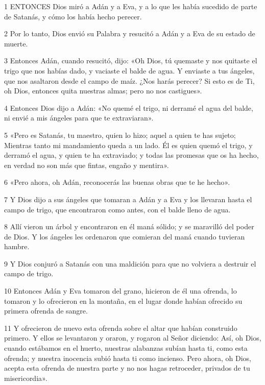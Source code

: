 \par 1 ENTONCES Dios miró a Adán y a Eva, y a lo que les había sucedido de parte de Satanás, y cómo los había hecho perecer.

\par 2 Por lo tanto, Dios envió su Palabra y resucitó a Adán y a Eva de su estado de muerte.

\par 3 Entonces Adán, cuando resucitó, dijo: «Oh Dios, tú quemaste y nos quitaste el trigo que nos habías dado, y vaciaste el balde de agua. Y enviaste a tus ángeles, que nos asaltaron desde el campo de maíz. ¿Nos harás perecer? Si esto es de Ti, oh Dios, entonces quita nuestras almas; pero no nos castigues».

\par 4 Entonces Dios dijo a Adán: «No quemé el trigo, ni derramé el agua del balde, ni envié a mis ángeles para que te extraviaran».

\par 5 «Pero es Satanás, tu maestro, quien lo hizo; aquel a quien te has sujeto; Mientras tanto mi mandamiento queda a un lado. Él es quien quemó el trigo, y derramó el agua, y quien te ha extraviado; y todas las promesas que os ha hecho, en verdad no son más que fintas, engaño y mentira».

\par 6 «Pero ahora, oh Adán, reconocerás las buenas obras que te he hecho».

\par 7 Y Dios dijo a sus ángeles que tomaran a Adán y a Eva y los llevaran hasta el campo de trigo, que encontraron como antes, con el balde lleno de agua.

\par 8 Allí vieron un árbol y encontraron en él maná sólido; y se maravilló del poder de Dios. Y los ángeles les ordenaron que comieran del maná cuando tuvieran hambre.

\par 9 Y Dios conjuró a Satanás con una maldición para que no volviera a destruir el campo de trigo.

\par 10 Entonces Adán y Eva tomaron del grano, hicieron de él una ofrenda, lo tomaron y lo ofrecieron en la montaña, en el lugar donde habían ofrecido su primera ofrenda de sangre.

\par 11 Y ofrecieron de nuevo esta ofrenda sobre el altar que habían construido primero. Y ellos se levantaron y oraron, y rogaron al Señor diciendo: Así, oh Dios, cuando estábamos en el huerto, nuestras alabanzas subían hasta ti, como esta ofrenda; y nuestra inocencia subió hasta ti como incienso. Pero ahora, oh Dios, acepta esta ofrenda de nuestra parte y no nos hagas retroceder, privados de tu misericordia».

